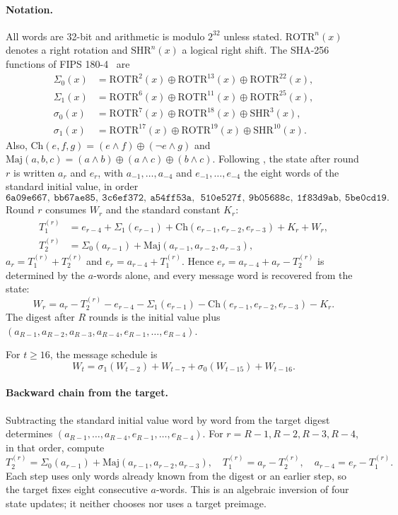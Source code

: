 \documentclass[11pt,a4paper]{article}
\newcommand{\Sig}[1]{\Sigma_{#1}}
\newcommand{\sig}[1]{\sigma_{#1}}
\newcommand{\Maj}{\mathrm{Maj}}
\newcommand{\Ch}{\mathrm{Ch}}
\newcommand{\ROTR}{\mathrm{ROTR}}
\newcommand{\SHR}{\mathrm{SHR}}
\newcommand{\hex}[1]{\texttt{#1}}
\begin{document}
\paragraph{Notation.}
All words are 32-bit and arithmetic is modulo $2^{32}$ unless stated.
$\ROTR^n(x)$ denotes a right rotation and $\SHR^n(x)$ a logical right shift.
The SHA-256 functions of FIPS 180-4~\cite{FIPS180} are
\begin{align*}
\Sig0(x)&=\ROTR^2(x)\oplus\ROTR^{13}(x)\oplus\ROTR^{22}(x),\\
\Sig1(x)&=\ROTR^6(x)\oplus\ROTR^{11}(x)\oplus\ROTR^{25}(x),\\
\sig0(x)&=\ROTR^7(x)\oplus\ROTR^{18}(x)\oplus\SHR^3(x),\\
\sig1(x)&=\ROTR^{17}(x)\oplus\ROTR^{19}(x)\oplus\SHR^{10}(x).
\end{align*}
Also, $\Ch(e,f,g)=(e\wedge f)\oplus(\neg e\wedge g)$ and
$\Maj(a,b,c)=(a\wedge b)\oplus(a\wedge c)\oplus(b\wedge c)$.  Following
\cite{Basra2026R19}, the state after round $r$ is written $a_r$ and $e_r$,
with $a_{-1},\dots,a_{-4}$ and $e_{-1},\dots,e_{-4}$ the eight words of the
standard initial value, in order
\[
\hex{6a09e667},\ \hex{bb67ae85},\ \hex{3c6ef372},\ \hex{a54ff53a},\
\ \hex{510e527f},\ \hex{9b05688c},\ \hex{1f83d9ab},\ \hex{5be0cd19}.
\]
Round $r$ consumes $W_r$ and the standard constant $K_r$:
\begin{align*}
T_1^{(r)} &= e_{r-4}+\Sig1(e_{r-1})+\Ch(e_{r-1},e_{r-2},e_{r-3})+K_r+W_r,\\
T_2^{(r)} &= \Sig0(a_{r-1})+\Maj(a_{r-1},a_{r-2},a_{r-3}),
\end{align*}
$a_r=T_1^{(r)}+T_2^{(r)}$ and $e_r=a_{r-4}+T_1^{(r)}$.  Hence
$e_r=a_{r-4}+a_r-T_2^{(r)}$ is determined by the $a$-words alone, and every
message word is recovered from the state:
\begin{equation}
W_r = a_r - T_2^{(r)} - e_{r-4} - \Sig1(e_{r-1}) - \Ch(e_{r-1},e_{r-2},e_{r-3}) - K_r .
\label{eq:recW}
\end{equation}
The digest after $R$ rounds is the initial value plus
$(a_{R-1},a_{R-2},a_{R-3},a_{R-4},e_{R-1},\dots,e_{R-4})$.

For $t\ge16$, the message schedule is
\begin{equation}
W_t=\sig1(W_{t-2})+W_{t-7}+\sig0(W_{t-15})+W_{t-16}.
\label{eq:schedule}
\end{equation}

\paragraph{Backward chain from the target.}
Subtracting the standard initial value word by word from the target digest
determines $(a_{R-1},\ldots,a_{R-4},e_{R-1},\ldots,e_{R-4})$.  For
$r=R-1,R-2,R-3,R-4$, in that order, compute
\begin{equation}
T_2^{(r)}=\Sig0(a_{r-1})+\Maj(a_{r-1},a_{r-2},a_{r-3}),\quad
T_1^{(r)}=a_r-T_2^{(r)},\quad
a_{r-4}=e_r-T_1^{(r)}.
\label{eq:backward}
\end{equation}
Each step uses only words already known from the digest or an earlier step,
so the target fixes eight consecutive $a$-words.  This is an algebraic
inversion of four state updates; it neither chooses nor uses a target
preimage.
\end{document}
